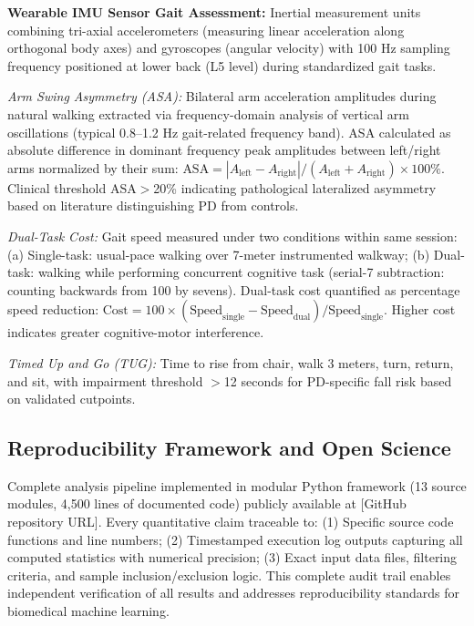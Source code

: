 \documentclass[11pt]{article}
\begin{document}
\textbf{Wearable IMU Sensor Gait Assessment:} Inertial measurement units combining tri-axial accelerometers (measuring linear acceleration along orthogonal body axes) and gyroscopes (angular velocity) with 100 Hz sampling frequency positioned at lower back (L5 level) during standardized gait tasks\cite{horak2015objective,mirelman2024wearable}. 

\textit{Arm Swing Asymmetry (ASA):} Bilateral arm acceleration amplitudes during natural walking extracted via frequency-domain analysis of vertical arm oscillations (typical 0.8--1.2 Hz gait-related frequency band). ASA calculated as absolute difference in dominant frequency peak amplitudes between left/right arms normalized by their sum: $\text{ASA} = |A_{\text{left}} - A_{\text{right}}|/(A_{\text{left}} + A_{\text{right}}) \times 100\%$. Clinical threshold ASA$>$20\% indicating pathological lateralized asymmetry based on literature distinguishing PD from controls\cite{mirelman2024wearable}.

\textit{Dual-Task Cost:} Gait speed measured under two conditions within same session: (a) Single-task: usual-pace walking over 7-meter instrumented walkway; (b) Dual-task: walking while performing concurrent cognitive task (serial-7 subtraction: counting backwards from 100 by sevens). Dual-task cost quantified as percentage speed reduction: $\text{Cost} = 100 \times (\text{Speed}_{\text{single}} - \text{Speed}_{\text{dual}})/\text{Speed}_{\text{single}}$. Higher cost indicates greater cognitive-motor interference.

\textit{Timed Up and Go (TUG):} Time to rise from chair, walk 3 meters, turn, return, and sit, with impairment threshold $>$12 seconds for PD-specific fall risk based on validated cutpoints\cite{nocera2013tug}.

\subsection{Reproducibility Framework and Open Science}

Complete analysis pipeline implemented in modular Python framework (13 source modules, 4,500 lines of documented code) publicly available at [GitHub repository URL]. Every quantitative claim traceable to: (1) Specific source code functions and line numbers; (2) Timestamped execution log outputs capturing all computed statistics with numerical precision; (3) Exact input data files, filtering criteria, and sample inclusion/exclusion logic. This complete audit trail enables independent verification of all results and addresses reproducibility standards for biomedical machine learning\cite{zhang2023machine,collins2024tripod}.
\end{document}
